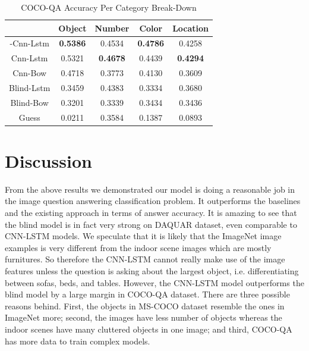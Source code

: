 \documentclass{article}
\renewcommand{\#}[1]{\textbf{#1}}
\begin{document}
\begin{table}[h]
\caption{COCO-QA Accuracy Per Category Break-Down}
\label{tab:cocoqa_acc_breakdown}
\vskip 0.15in
\begin{center}
\begin{small}
\begin{sc}
\begin{tabular}{c c c c c}
\hline
\abovespace\belowspace
           & Object    & Number   & Color    & Location \\
\hline
\abovespace
2-Cnn-Lstm & \#{0.5386}& 0.4534   &\#{0.4786}& 0.4258   \\
Cnn-Lstm   & 0.5321    &\#{0.4678}& 0.4439   &\#{0.4294}\\
Cnn-Bow    & 0.4718    & 0.3773   & 0.4130   & 0.3609   \\
Blind-Lstm & 0.3459    & 0.4383   & 0.3334   & 0.3680   \\
Blind-Bow  & 0.3201    & 0.3339   & 0.3434   & 0.3436   \\
\belowspace
Guess      & 0.0211    & 0.3584   & 0.1387   & 0.0893   \\
\hline
\end{tabular}
\end{sc}
\end{small}
\end{center}
\end{table}


\section{Discussion}
From the above results we demonstrated our model is doing a reasonable job in the image question answering classification problem. It outperforms the baselines and the existing approach in terms of answer accuracy. It is amazing to see that the blind model is in fact very strong on DAQUAR dataset, even comparable to CNN-LSTM models. We speculate that it is likely that the ImageNet image examples is very different from the indoor scene images which are mostly furnitures. So therefore the CNN-LSTM cannot really make use of the image features unless the question is asking about the largest object, i.e. differentiating between sofas, beds, and tables. However, the CNN-LSTM model outperforms the blind model by a large margin in COCO-QA dataset. There are three possible reasons behind. First, the objects in MS-COCO dataset resemble the ones in ImageNet more; second, the images have less number of objects whereas the indoor scenes have many cluttered objects in one image; and third, COCO-QA has more data to train complex models. 
\end{document}
